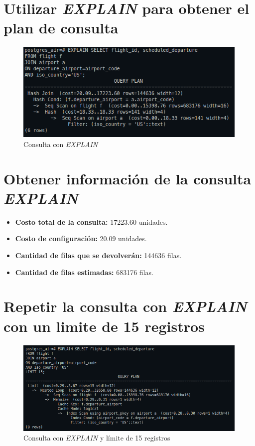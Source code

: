 \documentclass[11pt]{report}
\begin{document}
\section{Utilizar \emph{EXPLAIN} para obtener el plan de consulta}
\begin{figure}[H]
  \centering
  \includegraphics[scale=0.6]{img/consulta_explain_US.png}
  \caption{Consulta con \emph{EXPLAIN}}
  \label{fig:consulta con EXPLAIN}
\end{figure}

\section{Obtener información de la consulta \emph{EXPLAIN}}
\begin{itemize}
  \item \textbf{Costo total de la consulta:} 17223.60 unidades.
  \item \textbf{Costo de configuración:}  20.09 unidades.
  \item \textbf{Cantidad de filas que se devolverán:} 144636 filas.
  \item \textbf{Cantidad de filas estimadas:} 683176 filas.
\end{itemize}

\section{Repetir la consulta con \emph{EXPLAIN} con un limite de 15 registros}
\begin{figure}[H]
  \centering
  \includegraphics[scale=0.55]{img/consulta_explain_limit_US.png}
  \caption{Consulta con \emph{EXPLAIN} y límite de 15 registros}
  \label{fig:consulta con EXPLAIN y límite de 15 registros}
\end{figure}
\end{document}
